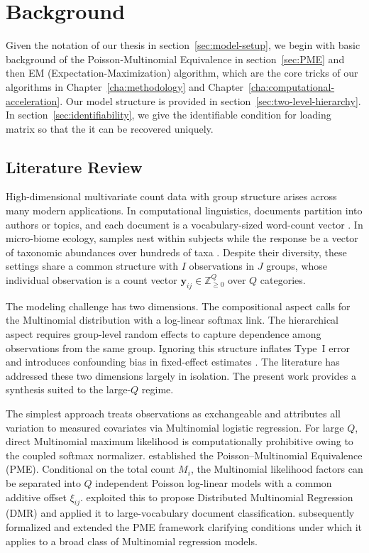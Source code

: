 \chapter{Background}
\label{cha:model-specification}

Given the notation of our thesis in section~\ref{sec:model-setup}, we begin with basic background of the Poisson-Multinomial Equivalence in section~\ref{sec:PME} and then EM (Expectation-Maximization) algorithm, which are the core tricks of our algorithms in Chapter~\ref{cha:methodology} and Chapter~\ref{cha:computational-acceleration}. Our model structure is provided in section~\ref{sec:two-level-hierarchy}. In section~\ref{sec:identifiability}, we give the identifiable condition for loading matrix so that the it can be recovered uniquely.

\section{Literature Review}
\label{sec:literature-review}
High-dimensional multivariate count data with group structure arises across many modern applications. In computational linguistics, documents partition into authors or topics, and each document is a vocabulary-sized word-count vector \citep{Taddy_2015}. In micro-biome ecology, samples nest within subjects while the response be a vector of taxonomic abundances over hundreds of taxa \citep{Tu2023}. Despite their diversity, these settings share a common structure with $I$ observations in $J$ groups, whose individual observation is a count vector $\bm{y}_{ij} \in \mathbb{Z}^Q_{\geq 0}$ over $Q$ categories.
 
The modeling challenge has two dimensions. The compositional aspect calls for the Multinomial distribution with a log-linear softmax link. The hierarchical aspect requires group-level random effects to capture dependence among observations from the same group. Ignoring this structure inflates Type~I error and introduces confounding bias in fixed-effect estimates \citep{Lee2019AnalysisOG}. The literature has addressed these two dimensions largely in isolation. The present work provides a synthesis suited to the large-$Q$ regime.
 
The simplest approach treats observations as exchangeable and attributes all variation to measured covariates via Multinomial logistic regression. For large $Q$, direct Multinomial maximum likelihood is computationally prohibitive owing to the coupled softmax normalizer. \citet{10.2307/2348134} established the Poisson--Multinomial Equivalence (PME). Conditional on the total count $M_i$, the Multinomial likelihood factors can be separated into $Q$ independent Poisson log-linear models with a common additive offset $\xi_{ij}$. \citet{Taddy_2015} exploited this to propose Distributed Multinomial Regression (DMR) and applied it to large-vocabulary document classification. \citet{lee2017poissontrickextensionsfitting} subsequently formalized and extended the PME framework clarifying conditions under which it applies to a broad class of Multinomial regression models.
 

